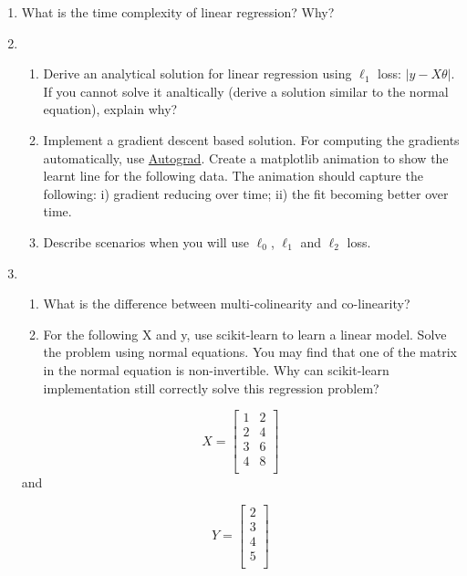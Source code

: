 \documentclass[]{article}
\begin{document}
\begin{enumerate}
	\item What is the time complexity of linear regression? Why?
	\item \begin{enumerate}
		\item Derive an analytical solution for linear regression using $\ell_1$ loss: $|y-X\theta|$. If you cannot solve it analtically (derive a solution similar to the normal equation), explain why? 
		\item Implement a gradient descent based solution. For computing the gradients automatically, use \href{https://github.com/HIPS/autograd}{Autograd}. Create a matplotlib animation to show the learnt line for the following data. The animation should capture the following: i) gradient reducing over time; ii) the fit becoming better over time.
		\item Describe scenarios when you will use $\ell_0$, $\ell_1$ and $\ell_2$ loss.
	\end{enumerate}
	\item \begin{enumerate}
		\item What is the difference between multi-colinearity and co-linearity? 
		\item 	For the following X and y, use scikit-learn to learn a linear model. Solve the problem using normal equations. You may find that one of the matrix in the normal equation is non-invertible. Why can scikit-learn implementation still correctly solve this regression problem?
	\end{enumerate}
	

	
$$X = \begin{bmatrix}

	
	1       & 2 \\
    2      &  4  \\
    3      &  6  \\
    4      &  8  \\

	\end{bmatrix}$$
	and 
	
	$$Y = \begin{bmatrix}
	
	
 2 \\
  3  \\
  4  \\
	5  \\
	
	\end{bmatrix}$$



\end{enumerate}
\end{document}
